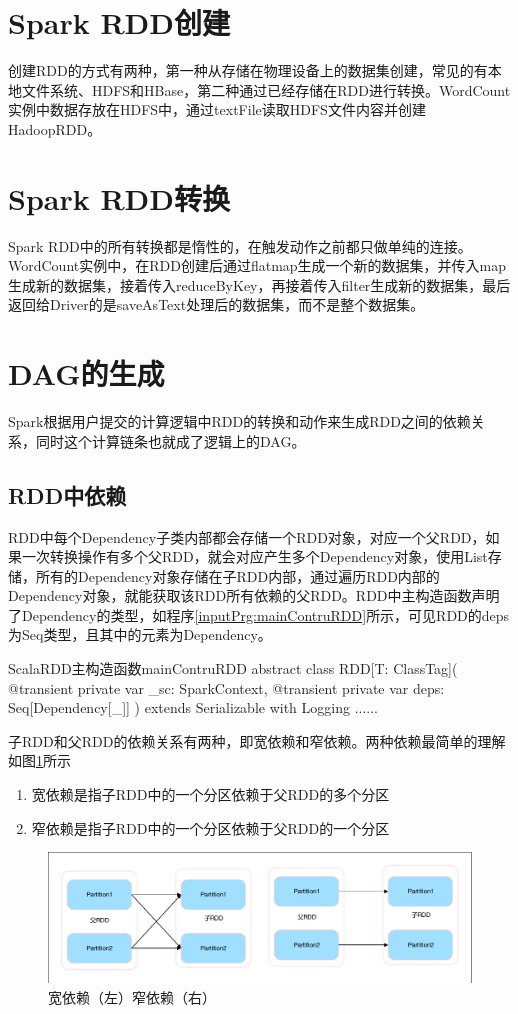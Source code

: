 \section{Spark RDD创建}

创建RDD的方式有两种，第一种从存储在物理设备上的数据集创建，常见的有本地文件系统、HDFS和HBase，第二种通过已经存储在RDD进行转换。WordCount实例中数据存放在HDFS中，通过textFile读取HDFS文件内容并创建HadoopRDD。
\section{Spark RDD转换}

Spark RDD中的所有转换都是惰性的，在触发动作之前都只做单纯的连接。WordCount实例中，在RDD创建后通过flatmap生成一个新的数据集，并传入map生成新的数据集，接着传入reduceByKey，再接着传入filter生成新的数据集，最后返回给Driver的是saveAsText处理后的数据集，而不是整个数据集。
\section{DAG的生成}

Spark根据用户提交的计算逻辑中RDD的转换和动作来生成RDD之间的依赖关系，同时这个计算链条也就成了逻辑上的DAG。
\subsection{RDD中依赖}

RDD中每个Dependency子类内部都会存储一个RDD对象，对应一个父RDD，如果一次转换操作有多个父RDD，就会对应产生多个Dependency对象，使用List存储，所有的Dependency对象存储在子RDD内部，通过遍历RDD内部的Dependency对象，就能获取该RDD所有依赖的父RDD。RDD中主构造函数声明了Dependency的类型，如程序\ref{inputPrg:mainContruRDD}所示，可见RDD的deps为Seq类型，且其中的元素为Dependency。
\begin{codeInput}{Scala}{RDD主构造函数}{mainContruRDD}
abstract class RDD[T: ClassTag](
  @transient private var _sc: SparkContext,
  @transient private var deps: Seq[Dependency[_]]
  ) extends Serializable with Logging {
    ......
}
\end{codeInput}
子RDD和父RDD的依赖关系有两种，即宽依赖和窄依赖。两种依赖最简单的理解如图\ref{fig:deps}所示
\begin{enumerate}[\bfseries 1]
	\item 宽依赖是指子RDD中的一个分区依赖于父RDD的多个分区
	\item 窄依赖是指子RDD中的一个分区依赖于父RDD的一个分区
\end{enumerate}
\begin{figure}[H] 
	\centering
	\includegraphics[width=\textwidth]{figures/wideandnarroewdeps.pdf}
	\caption{宽依赖（左）窄依赖（右）}
	\label{fig:deps}
\end{figure}

